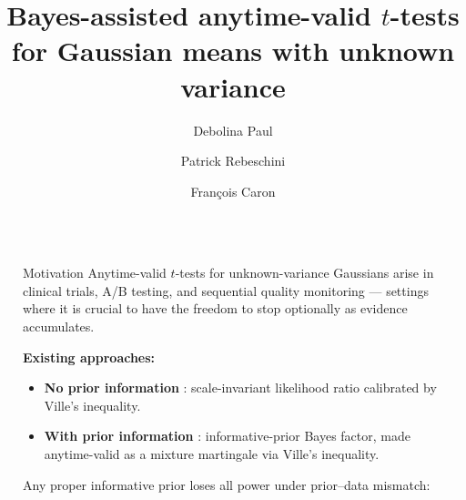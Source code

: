 \documentclass[final]{beamer}
\title{Bayes-assisted anytime-valid \texorpdfstring{$t$}{t}-tests for Gaussian means with unknown variance}
\author{Debolina Paul \and Patrick Rebeschini \and Fran\c{c}ois Caron}
\institute[shortinst]{Department of Statistics, University of Oxford}
\newlength{\sepwidth}
\newlength{\colwidth}
\newcommand{\separatorcolumn}{\begin{column}{\sepwidth}\end{column}}
\begin{document}
\begin{frame}[t]
\begin{columns}[t]
\separatorcolumn

\begin{column}{\colwidth}

  \begin{block}{Motivation}
Anytime-valid $t$-tests for unknown-variance Gaussians arise in clinical trials, A/B testing, and sequential quality monitoring --- settings where it is crucial to have the freedom to stop optionally as evidence accumulates.

\textbf{Existing approaches:}
\begin{itemize}
  \setlength\itemsep{0.08cm}
  \item \textbf{No prior information} \cite{Lai1976,PerezOrtiz2024,Wang2025}: scale-invariant likelihood ratio calibrated by Ville's inequality.
  \item \textbf{With prior information} \cite{Rouder2009}: informative-prior Bayes factor, made anytime-valid as a mixture martingale via Ville's inequality.
\end{itemize}

\alert{Any proper informative prior loses all power under prior--data mismatch:} 
  \begin{center}
\end{center}
\end{block}
\end{column}
\end{columns}
\end{frame}
\end{document}
